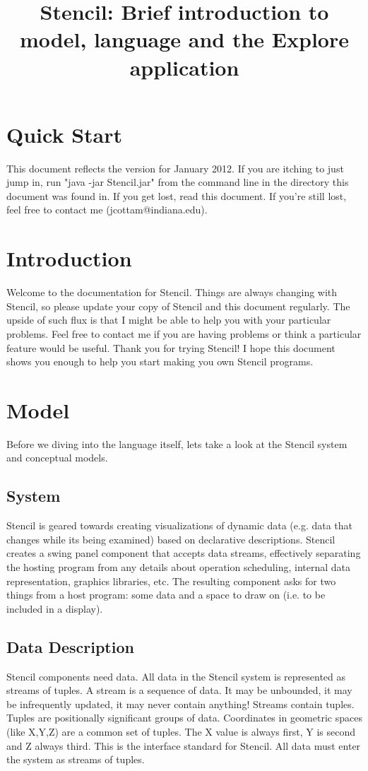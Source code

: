 \documentclass{article}
\title {Stencil: Brief introduction to model, language and the Explore application}
\begin{document}
\maketitle

\section {Quick Start}
This  document reflects the version for January 2012.
If you are itching to just jump in, run "java -jar Stencil.jar" from the command line in the directory this document was found in.  
If you get lost, read this document.  If you're still lost, feel free to contact me (jcottam@indiana.edu).


\section{Introduction}
Welcome to the documentation for Stencil.  
Things are always changing with Stencil, so please update your copy of Stencil and this document regularly.  
The upside of such flux is that I might be able to help you with your particular problems.  
Feel free to contact me if you are having problems or think a particular feature would be useful.  
Thank you for trying Stencil!  
I hope this document shows you enough to help you start making you own Stencil programs.

\section{Model}
Before we diving into the language itself, lets take a look at the Stencil system and conceptual models.


\subsection{System}
Stencil is geared towards creating visualizations of dynamic data (e.g. data that changes while its being examined) based on declarative descriptions.
Stencil creates a swing panel component that accepts data streams, 
effectively separating the hosting program from any details about operation scheduling, 
internal data representation, graphics libraries, etc.
%
The resulting component asks for two things from a host program: some data and a space to draw on (i.e. to be included in a display).  

\subsection{Data Description}
Stencil components need data.  
All data in the Stencil system is represented as streams of tuples.
A stream is a sequence of data.  
It may be unbounded, it may be infrequently updated, it may never contain anything!
Streams contain tuples.  
Tuples are positionally significant groups of data.  
Coordinates in geometric spaces (like X,Y,Z) are a common set of tuples.  
The X value is always first, Y is second and Z always third.  
This is the interface standard for Stencil.  
All data must enter the system as streams of tuples.
\end{document}
